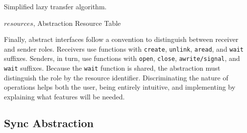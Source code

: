 			\begin{algorithm}[!b]
				\caption{Simplified lazy transfer algorithm.}%
				\label{alg:lazy-transfer}%
				\begin{algorithmic}[1]
				\Require $resources$, Abstraction Resource Table


						\Else
						\EndIf
					\EndProcedure%


						\Else
						\EndIf
					\EndProcedure%


						                                
					\EndProcedure%

				\end{algorithmic}%

			\end{algorithm}

			Finally, abstract interfaces follow a convention to distinguish
			between receiver and sender roles. Receivers use functions with
			\texttt{create}, \texttt{unlink}, \texttt{aread}, and \texttt{wait}
			suffixes. Senders, in turn, use functions with \texttt{open},
			\texttt{close}, \texttt{awrite/signal}, and \texttt{wait} suffixes.
			Because the \texttt{wait} function is shared, the abstraction must
			distinguish the role by the resource identifier. Discriminating the
			nature of operations helps both the user, being entirely intuitive,
			and implementing \hal by explaining what features will be needed.

		\subsection{Sync Abstraction}
		\label{sec.sync-abs}

